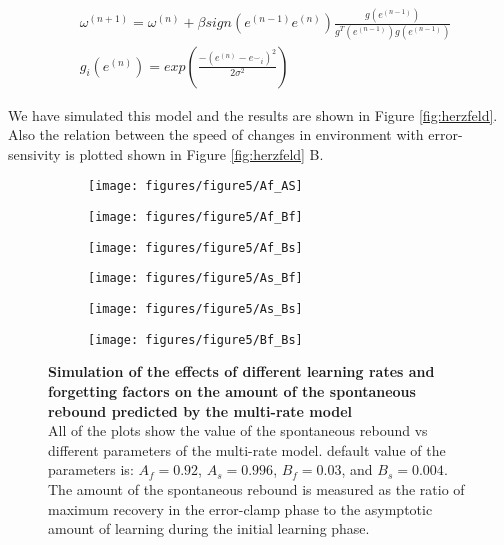 \documentclass[9pt,twocolumn]{paper-template}
\begin{document}
\begin{eqnarray*}
& \omega^{(n+1)} = \omega^{(n)}+\beta sign(e^{(n-1)}e^{(n)}) \frac{g(e^{(n-1)})}{g^T(e^{(n-1)})g(e^{(n-1)})}\\
&g_i(e^{(n)}) = exp(\frac{-(e^{(n)}-{e^\smallsmile}_i)^2}{2\sigma^2})
\end{eqnarray*}

We have simulated this model and the results are shown in Figure \ref{fig:herzfeld}. Also the relation between the speed of changes in environment with error-sensivity is plotted shown in Figure \ref{fig:herzfeld} B. 

\begin{figure}[h!]
  \centering
  \begin{subfigure}[b]{0.32\linewidth}
    \texttt{[image: figures/figure5/Af\_AS]}
  \end{subfigure}
  \begin{subfigure}[b]{0.32\linewidth}
    \texttt{[image: figures/figure5/Af\_Bf]}
  \end{subfigure}
   \begin{subfigure}[b]{0.32\linewidth}
    \texttt{[image: figures/figure5/Af\_Bs]}
  \end{subfigure}
    \begin{subfigure}[b]{0.32\linewidth}
    \texttt{[image: figures/figure5/As\_Bf]}
  \end{subfigure}
  \begin{subfigure}[b]{0.32\linewidth}
    \texttt{[image: figures/figure5/As\_Bs]}
  \end{subfigure}
   \begin{subfigure}[b]{0.32\linewidth}
    \texttt{[image: figures/figure5/Bf\_Bs]}
  \end{subfigure}
  \caption{\textbf{Simulation of the effects of different learning rates and forgetting factors on the amount of the spontaneous rebound predicted by the multi-rate model}\\
 All of the plots show the value of the spontaneous rebound vs different parameters of the multi-rate model. default value of the parameters is: $A_f=0.92$, $A_s=0.996$, $B_f=0.03$, and $B_s=0.004$. The amount of the spontaneous rebound is measured as the ratio of maximum recovery in the error-clamp phase to the asymptotic amount of learning during the initial learning phase. 
}
  \label{fig:mutli_rate_params}
\end{figure}
\end{document}
